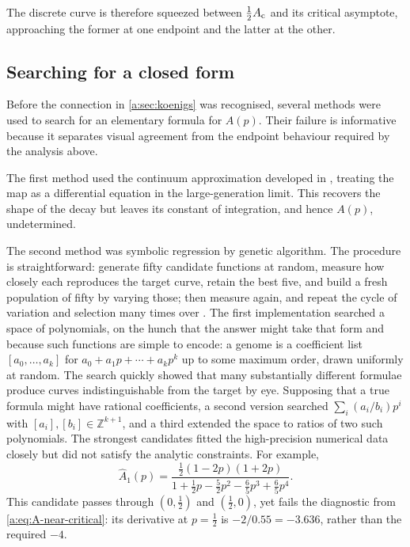 The discrete curve is therefore squeezed between $\tfrac12A_{\mathrm{c}}$ and its critical
asymptote, approaching the former at one endpoint and the latter at the other.

\subsection{Searching for a closed form}
\label{a:sec:GA}

Before the connection in \cref{a:sec:koenigs} was recognised, several methods were
used to search for an elementary formula for $A(p)$.  Their failure is informative
because it separates visual agreement from the endpoint behaviour required by the
analysis above.

The first method used the continuum approximation developed in \ChM, treating the
map as a differential equation in the large-generation limit.  This recovers the
shape of the decay but leaves its constant of integration, and hence $A(p)$,
undetermined.

The second method was symbolic regression by genetic algorithm.  The procedure is
straightforward:
generate fifty candidate functions at random, measure how closely each reproduces
the target curve, retain the best five, and build a fresh population of fifty by
varying those; then measure again, and repeat the cycle of variation and selection
many times over \cite{stanley2002evolving,cohen2024physics}.  The first
implementation searched a space of polynomials, on the hunch that the answer might
take that form and because such functions are simple to encode: a genome is a
coefficient list $[a_0,\dots,a_k]$ for $a_0+a_1p+\cdots+a_kp^k$ up to some maximum
order, drawn uniformly at random.  The search quickly showed that many
substantially different formulae produce curves indistinguishable from the target
by eye. Supposing that a true formula might have rational coefficients, a second
version searched $\sum_i(a_i/b_i)p^i$ with $[a_i],[b_i]\in\mathbb Z^{k+1}$, and a
third extended the space to ratios of two such polynomials.  The strongest
candidates fitted the high-precision numerical data closely but did not satisfy the
analytic constraints.  For example,
\begin{equation}
\label{a:eq:A1hat}
\hat A_1(p) = \frac{\tfrac12(1-2p)(1+2p)}
{1+\tfrac12p-\tfrac52p^2-\tfrac65p^3+\tfrac65p^4} .
\end{equation}
This candidate passes through $(0,\tfrac12)$ and $(\tfrac12,0)$, yet fails the
diagnostic from \cref{a:eq:A-near-critical}: its derivative at $p=\tfrac12$ is
$-2/0.55=-3.636$, rather than the required $-4$.

